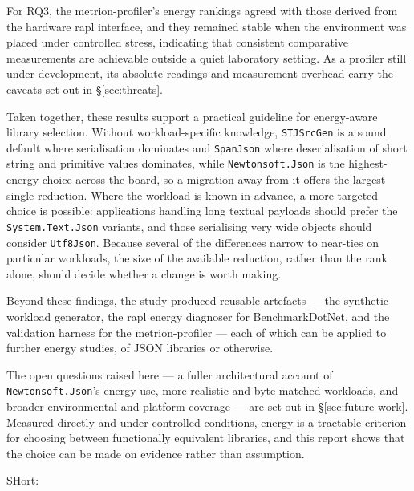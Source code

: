 For RQ3, the \gls{metrion-profiler}'s energy rankings agreed with those
derived from the hardware \gls{rapl} interface, and they remained stable when
the environment was placed under controlled stress, indicating that
consistent comparative measurements are achievable outside a quiet laboratory
setting. %
As a profiler still under development, its absolute readings and measurement
overhead carry the caveats set out in \S\ref{sec:threats}.

Taken together, these results support a practical guideline for energy-aware
library selection. Without workload-specific knowledge, \texttt{STJSrcGen} is
a sound default where serialisation dominates and \texttt{SpanJson} where
deserialisation of short string and primitive values dominates, while
\texttt{Newtonsoft.Json} is the highest-energy choice across the board, so a
migration away from it offers the largest single reduction. Where the
workload is known in advance, a more targeted choice is possible: applications
handling long textual payloads should prefer the \texttt{System.Text.Json}
variants, and those serialising very wide objects should consider
\texttt{Utf8Json}. Because several of the differences narrow to near-ties on
particular workloads, the size of the available reduction, rather than the
rank alone, should decide whether a change is worth making.

Beyond these findings, the study produced reusable artefacts --- the
synthetic workload generator, the \gls{rapl} energy diagnoser for
BenchmarkDotNet, and the validation harness for the \gls{metrion-profiler}
--- each of which can be applied to further energy studies, of JSON libraries
or otherwise.

The open questions raised here --- a fuller architectural account of
\texttt{Newtonsoft.Json}'s energy use, more realistic and byte-matched
workloads, and broader environmental and platform coverage --- are set out in
\S\ref{sec:future-work}. Measured directly and under controlled conditions,
energy is a tractable criterion for choosing between functionally equivalent
libraries, and this report shows that the choice can be made on evidence
rather than assumption.




SHort: 

